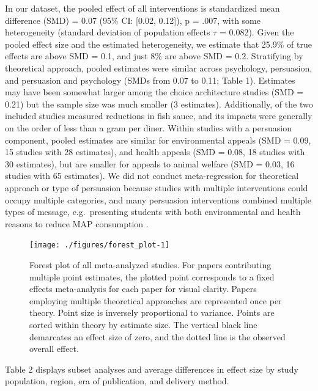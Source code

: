 \documentclass[sn-nature,referee,pdflatex]{sn-jnl}
\begin{document}
In our dataset, the pooled effect of all interventions is standardized
mean difference (SMD) = 0.07 (95\% CI: {[}0.02, 0.12{]}), p = .007, with
some heterogeneity (standard deviation of population effects \(\tau\) =
0.082). Given the pooled effect size and the estimated heterogeneity, we
estimate that 25.9\% of true effects are above SMD = 0.1, and just 8\%
are above SMD = 0.2. Stratifying by theoretical approach, pooled
estimates were similar across psychology, persuasion, and persuasion and
psychology (SMDs from 0.07 to 0.11; Table 1). Estimates may have been
somewhat larger among the choice architecture studies (SMD = 0.21) but
the sample size was much smaller (3 estimates). Additionally, of the two
included studies \citep{kanchanachitra2020} measured reductions in fish
sauce, and its impacts were generally on the order of less than a gram
per diner. Within studies with a persuasion component, pooled estimates
are similar for environmental appeals (SMD = 0.09, 15 studies with 28
estimates), and health appeals (SMD = 0.08, 18 studies with 30
estimates), but are smaller for appeals to animal welfare (SMD = 0.03,
16 studies with 65 estimates). We did not conduct meta-regression for
theoretical approach or type of persuasion because studies with multiple
interventions could occupy multiple categories, and many persuasion
interventions combined multiple types of message, e.g.~presenting
students with both environmental and health reasons to reduce MAP
consumption \citep{jalil2023}.

\begin{figure}[H]

{\centering \texttt{[image: ./figures/forest\_plot-1]} 

}

\caption{Forest plot of all meta-analyzed studies. For papers contributing multiple point estimates, the plotted point corresponds to a fixed effects meta-analysis for each paper for visual clarity. Papers employing multiple theoretical approaches are represented once per theory. Point size is inversely proportional to variance. Points are sorted within theory by estimate size. The vertical black line demarcates an effect size of zero, and the dotted line is the observed overall effect.}\label{fig:forest_plot}
\end{figure}

Table 2 displays subset analyses and average differences in effect size
by study population, region, era of publication, and delivery method.
\end{document}

